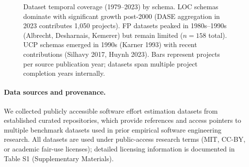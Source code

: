 \documentclass{ieeeaccess}
\begin{document}
\begin{figure}[h]
\centering
{}
\caption{Dataset temporal coverage (1979--2023) by schema. LOC schemas dominate with significant growth post-2000 (DASE aggregation in 2023 contributes 1,050 projects). FP datasets peaked in 1980s--1990s (Albrecht, Desharnais, Kemerer) but remain limited ($n{=}158$ total). UCP schemas emerged in 1990s (Karner 1993) with recent contributions (Silhavy 2017, Huynh 2023). Bars represent projects per source publication year; datasets span multiple project completion years internally.}
\label{fig:dataset-timeline}
\end{figure}

\paragraph{Data sources and provenance.}
We collected publicly accessible software effort estimation datasets from established curated repositories\cite{jones2022estimation,rodriguez2023dase}, which provide references and access pointers to multiple benchmark datasets used in prior empirical software engineering research. All datasets are used under public-access research terms (MIT, CC-BY, or academic fair-use licenses); detailed licensing information is documented in Table S1 (Supplementary Materials).
\end{document}
